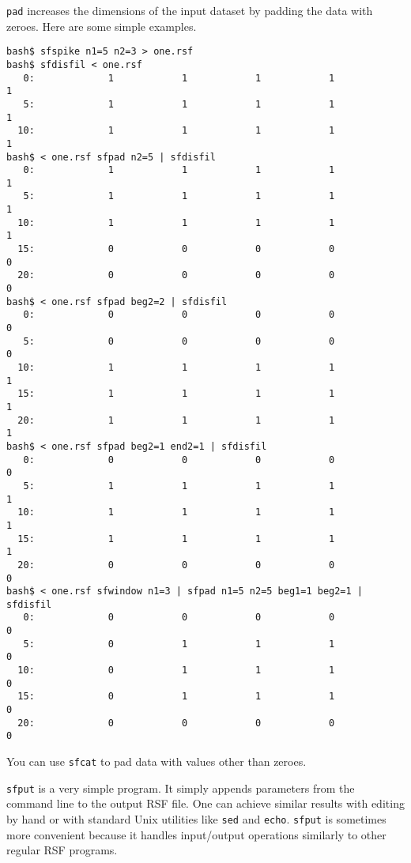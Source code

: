 \noindent\doublebox{\parbox{\textwidth}{
    
  }}

\texttt{pad} increases the dimensions of the input dataset by padding
the data with zeroes. Here are some simple examples.

\begin{verbatim}
bash$ sfspike n1=5 n2=3 > one.rsf
bash$ sfdisfil < one.rsf
   0:             1            1            1            1            1
   5:             1            1            1            1            1
  10:             1            1            1            1            1
bash$ < one.rsf sfpad n2=5 | sfdisfil
   0:             1            1            1            1            1
   5:             1            1            1            1            1
  10:             1            1            1            1            1
  15:             0            0            0            0            0
  20:             0            0            0            0            0
bash$ < one.rsf sfpad beg2=2 | sfdisfil
   0:             0            0            0            0            0
   5:             0            0            0            0            0
  10:             1            1            1            1            1
  15:             1            1            1            1            1
  20:             1            1            1            1            1
bash$ < one.rsf sfpad beg2=1 end2=1 | sfdisfil
   0:             0            0            0            0            0
   5:             1            1            1            1            1
  10:             1            1            1            1            1
  15:             1            1            1            1            1
  20:             0            0            0            0            0
bash$ < one.rsf sfwindow n1=3 | sfpad n1=5 n2=5 beg1=1 beg2=1 | sfdisfil
   0:             0            0            0            0            0
   5:             0            1            1            1            0
  10:             0            1            1            1            0
  15:             0            1            1            1            0
  20:             0            0            0            0            0
\end{verbatim}
You can use \texttt{sfcat} to pad data with values other than zeroes.

\noindent\doublebox{\parbox{\textwidth}{
    
  }}

\texttt{sfput} is a very simple program. It simply appends parameters
from the command line to the output RSF file. One can achieve similar
results with editing by hand or with standard Unix utilities like
\texttt{sed} and \texttt{echo}. \texttt{sfput} is sometimes more
convenient because it handles input/output operations similarly to
other regular RSF programs.

